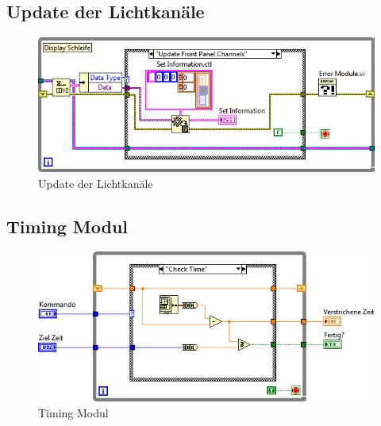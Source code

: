 	

	\subsection{Update der Lichtkanäle}
	\begin{figure}[!h]
	\centering
		\includegraphics[width=\textwidth]{Pics/front-kanale.png}
	\caption{Update der Lichtkanäle}
	\label{fig:a7}
	\end{figure}
	
	\subsection{Timing Modul}
	\begin{figure}[!h]
	\centering
		\includegraphics[width=\textwidth]{Pics/zeit.png}
	\caption{Timing Modul}
	\label{fig:a8}
	\end{figure}
	\newpage	
	
